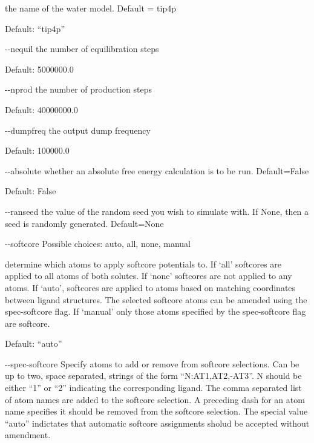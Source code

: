 \documentclass[letterpaper,10pt,english]{sphinxmanual}
\begin{document}
\begin{optionlist}{3cm}
the name of the water model. Default = tip4p

Default: “tip4p”
\item [-{-}nequil]  
the number of equilibration steps

Default: 5000000.0
\item [-{-}nprod]  
the number of production steps

Default: 40000000.0
\item [-{-}dumpfreq]  
the output dump frequency

Default: 100000.0
\item [-{-}absolute]  
whether an absolute free energy calculation is to be run. Default=False

Default: False
\item [-{-}ranseed]  
the value of the random seed you wish to simulate with. If None, then a seed is randomly generated. Default=None
\item [-{-}softcore]  
Possible choices: auto, all, none, manual

determine which atoms to apply softcore potentials to. If ‘all’ softcores are applied to all atoms of both solutes. If ‘none’ softcores are not applied to any atoms. If ‘auto’, softcores are applied to atoms based on matching coordinates between ligand structures. The selected softcore atoms can be amended using the \textendash{}spec-softcore flag. If ‘manual’ only those atoms specified by the \textendash{}spec-softcore flag are softcore.

Default: “auto”
\item [-{-}spec-softcore]  
Specify atoms to add or remove from softcore selections. Can be up to two, space separated, strings of the form “N:AT1,AT2,-AT3”. N should be either “1” or “2” indicating the corresponding ligand. The comma separated list of atom names are added to the softcore selection. A preceding dash for an atom name specifies it should be removed from the softcore selection. The special value “auto” indictates that automatic softcore assignments sholud be accepted without amendment.
\end{optionlist}

\end{document}

